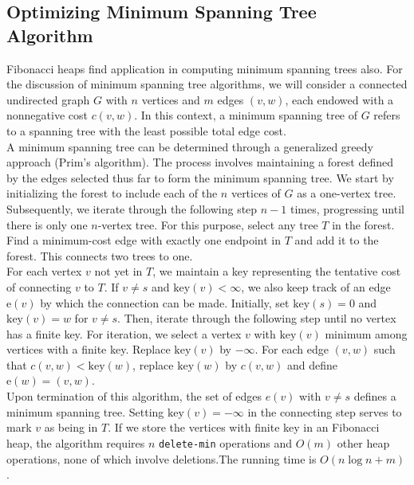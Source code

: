 \documentclass[12pt, a4paper]{article}
\begin{document}
\subsection{Optimizing Minimum Spanning Tree Algorithm}
Fibonacci heaps find application in computing minimum spanning trees also. For the discussion of minimum spanning tree algorithms, we will consider a connected undirected graph $G$ with $n$ vertices and $m$ edges $(v, w)$, each endowed with a nonnegative cost $c(v, w)$. In this context, a minimum spanning tree of $G$ refers to a spanning tree with the least possible total edge cost.\\
A minimum spanning tree can be determined through a generalized greedy approach (Prim's algorithm). The process involves maintaining a forest defined by the edges selected thus far to form the minimum spanning tree. We start by initializing the forest to include each of the $n$ vertices of $G$ as a one-vertex tree. Subsequently, we iterate through the following step $n - 1$ times, progressing until there is only one $n$-vertex tree.
For this purpose, select any tree $T$ in the forest. Find a minimum-cost edge with exactly one endpoint in $T$ and add it to the forest. This connects two trees to one.\\
For each vertex $v$ not yet in $T$, we maintain a key representing the tentative cost of connecting $v$ to $T$. If $v \neq s$ and $\text{key}(v) < \infty$, we also keep track of an edge $\text{e}(v)$ by which the connection can be made. Initially, set $\text{key}(s) = 0$ and $\text{key}(v) = w$ for $v \neq s$. Then, iterate through the following step until no vertex has a finite key. For iteration, we select a vertex $v$ with $\text{key}(v)$ minimum among vertices with a finite key. Replace $\text{key}(v)$ by $-\infty$. For each edge $(v, w)$ such that $c(v, w) < \text{key}(w)$, replace $\text{key}(w)$ by $c(v, w)$ and define $\text{e}(w) = (v, w)$.\\
Upon termination of this algorithm, the set of edges $e(v)$ with $v \neq s$ defines a minimum spanning tree. Setting $\text{key}(v) = -\infty$ in the connecting step serves to mark $v$ as being in $T$.\cite{connectMst} If we store the vertices with finite key in an Fibonacci heap, the algorithm requires $n$ \texttt{delete-min} operations and $O(m)$ other heap operations, none of which involve deletions.The running time is $O(n \log n + m)$. \cite{fredman1987fibonacci}
\end{document}
